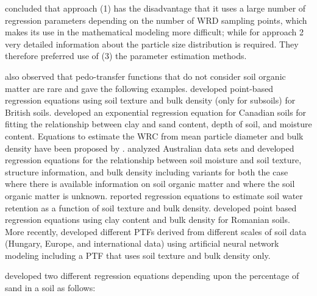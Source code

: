 \documentclass[11pt]{krantz}
\theoremstyle{definition}
\theoremstyle{definition}
\theoremstyle{definition}
\theoremstyle{remark}
\begin{document}
\citet{Zacharias2007SSSAJ} concluded that approach (1) has the
disadvantage that it uses a large number of regression parameters
depending on the number of WRD sampling points, which makes its use in
the mathematical modeling more difficult; while for approach 2 very
detailed information about the particle size distribution is required.
They therefore preferred use of (3) the parameter estimation methods.

\citet{Zacharias2007SSSAJ} also observed that pedo-transfer functions
that do not consider soil organic matter are rare and gave the following
examples. \citet{Hall1977} developed point-based regression equations
using soil texture and bulk density (only for subsoils) for British
soils. \citet{Oosterveld1980CAE} developed an exponential regression
equation for Canadian soils for fitting the relationship between clay
and sand content, depth of soil, and moisture content. Equations to
estimate the WRC from mean particle diameter and bulk density have been
proposed by \citet{Campbell1989}. \citet{Williams1992} analyzed
Australian data sets and developed regression equations for the
relationship between soil moisture and soil texture, structure
information, and bulk density including variants for both the case where
there is available information on soil organic matter and where the soil
organic matter is unknown. \citet{Rawls1989} reported regression
equations to estimate soil water retention as a function of soil texture
and bulk density. \citet{Canarache1993ST} developed point based
regression equations using clay content and bulk density for Romanian
soils. More recently, \citet{Nemes2003SSSAJ} developed different PTFs
derived from different scales of soil data (Hungary, Europe, and
international data) using artificial neural network modeling including a
PTF that uses soil texture and bulk density only.

\citet{Zacharias2007SSSAJ} developed two different regression equations
depending upon the percentage of sand in a soil as follows:
\end{document}
